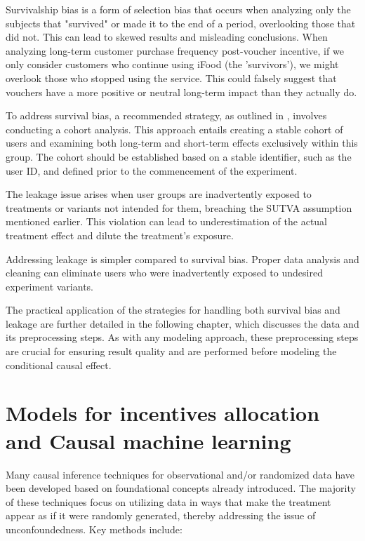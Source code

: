 Survivalship bias is a form of selection bias that occurs when analyzing only the subjects that "survived" or made it to the end of a period, overlooking those that
did not. This can lead to skewed results and misleading conclusions. When analyzing long-term customer purchase frequency post-voucher incentive, if
we only consider customers who continue using iFood (the 'survivors'), we might overlook those who stopped using the service. This could falsely suggest 
that vouchers have a more positive or neutral long-term impact than they actually do.

To address survival bias, a recommended strategy, as outlined in \textcite{kohavi_trustworthy_2020}, involves conducting a cohort analysis. This approach entails
creating a stable cohort of users and examining both long-term and short-term effects exclusively within this group. The cohort should be established based on a stable
identifier, such as the user ID, and defined prior to the commencement of the experiment.

The leakage issue arises when user groups are inadvertently exposed to treatments or variants not intended for them, breaching the \gls{SUTVA} assumption
mentioned earlier. This violation can lead to underestimation of the actual treatment effect and dilute the treatment's exposure.

Addressing leakage is simpler compared to survival bias. Proper data analysis and cleaning can eliminate users who were inadvertently exposed to undesired experiment
variants.

The practical application of the strategies for handling both survival bias and leakage are further detailed in the following chapter, which discusses the data and its preprocessing steps.
As with any modeling approach, these preprocessing steps are crucial for ensuring result quality and are performed before modeling the conditional causal effect.

\section{Models for incentives allocation and Causal machine learning}
\label{sec:causal_inference_models_intro} 

Many causal inference techniques for observational and/or randomized data have been developed based on foundational concepts already introduced. The majority of these techniques focus 
on utilizing data in ways that make the treatment appear as if it were randomly generated, thereby addressing the issue of unconfoundedness. Key methods include:

